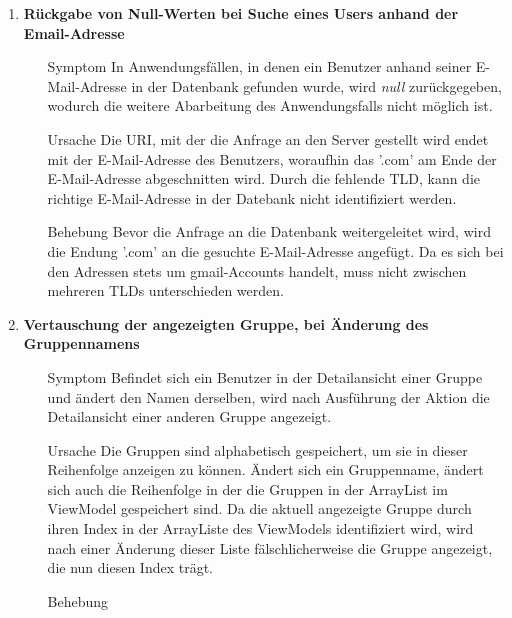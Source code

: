 \documentclass[11pt,a4paper]{scrartcl}
\def\threedigits#1{%
  \ifnum#1<100 0\fi
  \ifnum#1<10 0\fi
  \number#1}
\begin{document}
\begin{enumerate}[label={\textbf{/B\protect\threedigits{\theenumi}0/}}, leftmargin=*]
\item \textbf{Rückgabe von Null-Werten bei Suche eines Users anhand der Email-Adresse}
	\begin{itemize}
		\item[Symptom] In Anwendungsfällen, in denen ein Benutzer anhand seiner E-Mail-Adresse in der Datenbank gefunden wurde, wird \textit{null} zurückgegeben, wodurch die weitere Abarbeitung des Anwendungsfalls nicht möglich ist.
		\item[Ursache] Die URI, mit der die Anfrage an den Server gestellt wird endet mit der E-Mail-Adresse des Benutzers, woraufhin das '.com' am Ende der E-Mail-Adresse abgeschnitten wird. Durch die fehlende TLD, kann die richtige E-Mail-Adresse in der Datebank nicht identifiziert werden.
		\item[Behebung] Bevor die Anfrage an die Datenbank weitergeleitet wird, wird die Endung '.com' an die gesuchte E-Mail-Adresse angefügt. Da es sich bei den Adressen stets um gmail-Accounts handelt, muss nicht zwischen mehreren TLDs unterschieden werden.
	\end{itemize}
	
\item \textbf{Vertauschung der angezeigten Gruppe, bei Änderung des Gruppennamens}
	\begin{itemize}
		\item[Symptom] Befindet sich ein Benutzer in der Detailansicht einer Gruppe und ändert den Namen derselben, wird nach Ausführung der Aktion die Detailansicht einer anderen Gruppe angezeigt.
		\item[Ursache] Die Gruppen sind alphabetisch gespeichert, um sie in dieser Reihenfolge anzeigen zu können. Ändert sich ein Gruppenname, ändert sich auch die Reihenfolge in der die Gruppen in der ArrayList im ViewModel gespeichert sind. Da die aktuell angezeigte Gruppe durch ihren Index in der ArrayListe des ViewModels identifiziert wird, wird nach einer Änderung dieser Liste fälschlicherweise die Gruppe angezeigt, die nun diesen Index trägt.
		\item[Behebung] %
	\end{itemize}
	

\end{enumerate}
\end{document}
